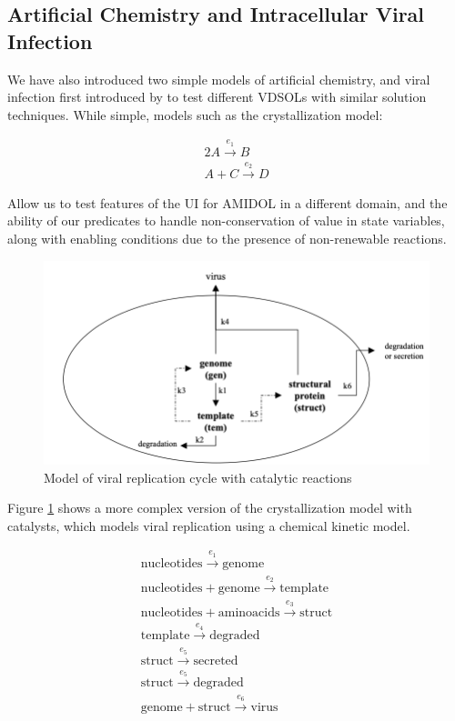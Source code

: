 \documentclass[11pt]{article}
\newcommand{\amidol}{\textsc{AMIDOL}}
\begin{document}
\subsection{Artificial Chemistry and Intracellular Viral Infection}

We have also introduced two simple models of artificial chemistry, and viral infection first introduced by \cite{srivastava2002stochastic,haseltine2002approximate} to test different VDSOLs with similar solution techniques.  While simple, models such as the crystallization model:

\begin{eqnarray}
  2A \overset{e_1}{\rightarrow} B\\
  A + C \overset{e_2}{\rightarrow} D
\end{eqnarray}

Allow us to test features of the UI for \amidol{} in a different domain, and the ability of our predicates to handle non-conservation of value in state variables, along with enabling conditions due to the presence of non-renewable reactions.

\begin{figure}
\includegraphics[width=\textwidth]{figs/ViralRep-Crop.png}
\caption{Model of viral replication cycle with catalytic reactions}
\label{Fig:ViralRep}
\end{figure}

Figure \ref{Fig:ViralRep} shows a more complex version of the crystallization model with catalysts, which models viral replication using a chemical kinetic model.

\begin{eqnarray}
\mathrm{nucleotides} \overset{e_1}{\rightarrow} \mathrm{genome}\\
\mathrm{nucleotides} + \mathrm{genome} \overset{e_2}{\rightarrow} \mathrm{template}\\
\mathrm{nucleotides} + \mathrm{aminoacids} \overset{e_3}{\rightarrow} \mathrm{struct}\\
\mathrm{template} \overset{e_4}{\rightarrow} \mathrm{degraded}\\
\mathrm{struct} \overset{e_5}{\rightarrow} \mathrm{secreted}\\
\mathrm{struct} \overset{e_5}{\rightarrow} \mathrm{degraded}\\
\mathrm{genome} + \mathrm{struct} \overset{e_6}{\rightarrow} \mathrm{virus}\\
\end{eqnarray}
\end{document}

